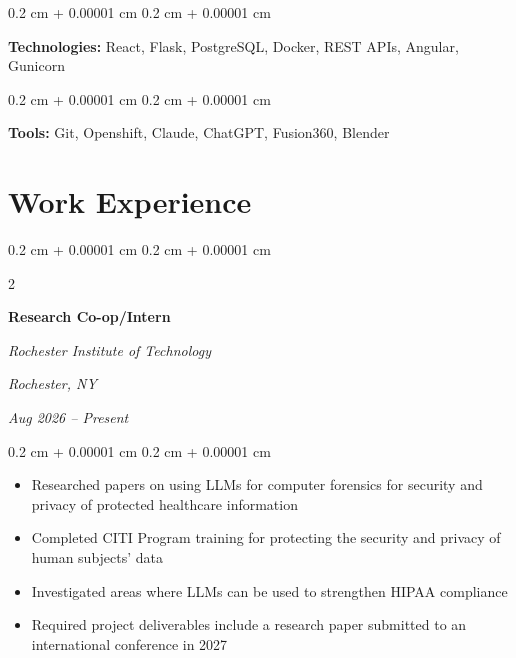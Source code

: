 \documentclass[10pt, letterpaper]{article}
\newenvironment{highlights}{
    \begin{itemize}[
        topsep=0.10 cm,
        parsep=0.10 cm,
        partopsep=0pt,
        itemsep=0pt,
        leftmargin=0.4 cm + 10pt
    ]
}{
    \end{itemize}
} %
\newenvironment{onecolentry}{
    \begin{adjustwidth}{
        0.2 cm + 0.00001 cm
    }{
        0.2 cm + 0.00001 cm
    }
}{
    \end{adjustwidth}
} %
\newenvironment{twocolentry}[2][]{
    \onecolentry
    \def\secondColumn{#2}
    \setcolumnwidth{\fill, 5.5 cm}
    \begin{paracol}{2}
}{
    \switchcolumn \raggedleft \secondColumn
    \end{paracol}
    \endonecolentry
} %
\begin{document}
        \vspace{0.1 cm}
        
        \begin{onecolentry}
            \textbf{Technologies:} React, Flask, PostgreSQL, Docker, REST APIs, Angular, Gunicorn
        
        \end{onecolentry}

        \vspace{0.1 cm}

        \begin{onecolentry}
            \textbf{Tools:} Git, Openshift, Claude, ChatGPT, Fusion360, Blender 
        
        \end{onecolentry}

        \vspace{0.1 cm}
    
    \section{Work Experience}
        \begin{twocolentry}{
        \textit{Rochester, NY}  
        
        \textit{Aug 2026 – Present}}
        
            \textbf{Research Co-op/Intern}
            
            \textit{Rochester Institute of Technology}
        \end{twocolentry}

        \vspace{0.10 cm}
        \begin{onecolentry}
            \begin{highlights}
                \item Researched papers on using LLMs for computer forensics for security and privacy of protected healthcare information 
                \item Completed CITI Program training for protecting the security and privacy of human subjects' data
                \item Investigated areas where LLMs can be used to strengthen HIPAA compliance 
                \item Required project deliverables include a research paper submitted to an international conference in 2027 %
            \end{highlights}
        \end{onecolentry}
\end{document}
